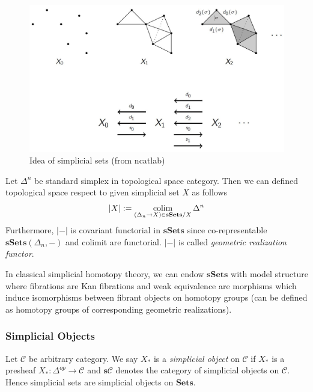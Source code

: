 \documentclass[b5paper,10pt]{article}
\begin{document}
\begin{figure}[h]
	\caption{Idea of simplicial sets (from ncatlab)}
\centering\includegraphics[scale=0.5]{PIC/SimplicialSetsIdea.jpg}
\end{figure}

Let $\Delta^n$ be standard simplex in topological space category. Then we can defined topological space respect to given simplicial set $X$ as follows
\[
|X| := \operatorname*{colim}_{(\Delta_n \to X) \in \mathbf{sSets}/X} \Delta^n
\]
Furthermore, $|-|$ is covariant functorial in $\mathbf{sSets}$ since co-representable $\mathbf{sSets}(\Delta_n,-)$ and colimit are functorial. $|-|$ is called \emph{geometric realization functor}.

In classical simplicial homotopy theory, we can endow $\mathbf{sSets}$ with model structure where fibrations are Kan fibrations and weak equivalence are morphisms which induce isomorphisms between fibrant objects on homotopy groups (can be defined as homotopy groups of corresponding geometric realizations).
\subsubsection{Simplicial Objects}
Let $\mathcal{C}$ be arbitrary category. We say $X_*$ is a \emph{simplicial object} on $\mathcal{C}$ if $X_*$ is a presheaf $X_* \colon \Delta^{op} \to \mathcal{C}$ and $\mathbf{s}\mathcal{C}$ denotes the category of simplicial objects on $\mathcal{C}$. Hence simplicial sets are simplicial objects on $\mathbf{Sets}$. 
\end{document}
